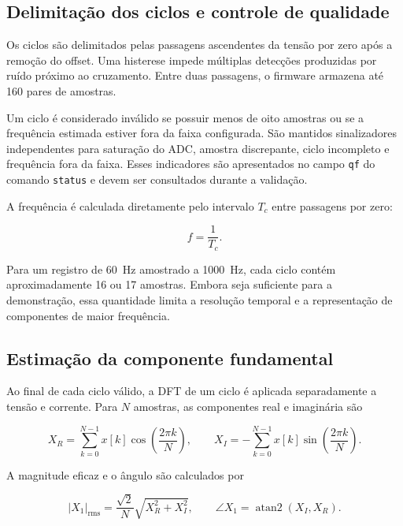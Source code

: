 \subsection{Delimitação dos ciclos e controle de qualidade}

Os ciclos são delimitados pelas passagens ascendentes da tensão por zero após a remoção do offset. Uma histerese impede múltiplas detecções produzidas por ruído próximo ao cruzamento. Entre duas passagens, o firmware armazena até 160 pares de amostras.

Um ciclo é considerado inválido se possuir menos de oito amostras ou se a frequência estimada estiver fora da faixa configurada. São mantidos sinalizadores independentes para saturação do ADC, amostra discrepante, ciclo incompleto e frequência fora da faixa. Esses indicadores são apresentados no campo \texttt{qf} do comando \texttt{status} e devem ser consultados durante a validação.

A frequência é calculada diretamente pelo intervalo $T_c$ entre passagens por zero:

\begin{equation}
  f=\frac{1}{T_c}.
\end{equation}

Para um registro de \SI{60}{\hertz} amostrado a \SI{1000}{\hertz}, cada ciclo contém aproximadamente 16 ou 17 amostras. Embora seja suficiente para a demonstração, essa quantidade limita a resolução temporal e a representação de componentes de maior frequência.

\subsection{Estimação da componente fundamental}

Ao final de cada ciclo válido, a DFT de um ciclo é aplicada separadamente a tensão e corrente. Para $N$ amostras, as componentes real e imaginária são

\begin{equation}
  X_R=\sum_{k=0}^{N-1}x[k]\cos\left(\frac{2\pi k}{N}\right), \qquad
  X_I=-\sum_{k=0}^{N-1}x[k]\sin\left(\frac{2\pi k}{N}\right).
\end{equation}

A magnitude eficaz e o ângulo são calculados por

\begin{equation}
  |X_1|_{\mathrm{rms}}=\frac{\sqrt{2}}{N}\sqrt{X_R^2+X_I^2}, \qquad
  \angle X_1=\operatorname{atan2}(X_I,X_R).
  \label{eq:dft-fundamental-implementacao}
\end{equation}

